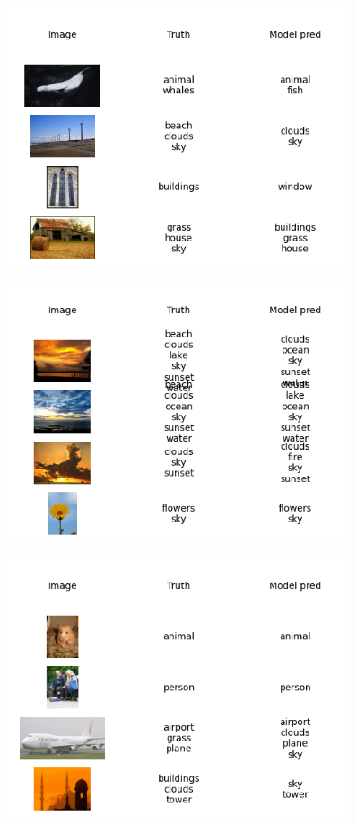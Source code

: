 \documentclass{udstu}
\begin{document}
\begin{figure}[!ht]
	\centering
	\includegraphics[width=0.9\textwidth]{PNG/showcase-350}
	\caption{}
\end{figure}

\begin{figure}[!ht]
	\centering
	\includegraphics[width=0.9\textwidth]{PNG/showcase-375}
	\caption{}
\end{figure}

\begin{figure}[!ht]
	\centering
	\includegraphics[width=0.9\textwidth]{PNG/showcase-400}
	\caption{}
\end{figure}
\end{document}
